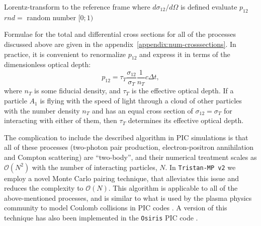 \begin{algorithm}[H]
    Lorentz-transform to the reference frame where $d\sigma_{12} / d\Omega$ is defined\;
    evaluate $p_{12}$\;
    $rnd =$ random number $[0;1)$\;
\end{algorithm}

\noindent Formulae for the total and differential cross sections for all of the processes discussed above are given in the appendix~\ref{appendix:num-crosssections}. In practice, it is convenient to renormalize $p_{12}$ and express it in terms of the dimensionless optical depth:
\begin{equation}
    p_{12} = \tau_{T} \frac{\sigma_{12}}{\sigma_T} \frac{1}{n_T} c \Delta t,
\end{equation}
\noindent where $n_T$ is some fiducial density, and $\tau_T$ is the effective optical depth. If a particle $A_1$ is flying with the speed of light through a cloud of other particles with the number density $n_T$ and has an equal cross section of $\sigma_{12}=\sigma_T$ for interacting with either of them, then $\tau_T$ determines its effective optical depth. 

The complication to include the described algorithm in PIC simulations is that all of these processes (two-photon pair production, electron-positron annihilation and Compton scattering) are ``two-body'', and their numerical treatment scales as $\mathcal{O}(N^2)$ with the number of interacting particles, $N$. In \texttt{Tristan-MP v2} we employ a novel Monte Carlo pairing technique, that alleviates this issue and reduces the complexity to $\mathcal{O}(N)$. This algorithm is applicable to all of the above-mentioned processes, and is similar to what is used by the plasma physics community to model Coulomb collisions in PIC codes \citep[see, e.g.,][]{2009shin.confE.163D}. A version of this technique has also been implemented in the \texttt{Osiris} PIC code \citep{2020JPlPh..86e9016D}.

